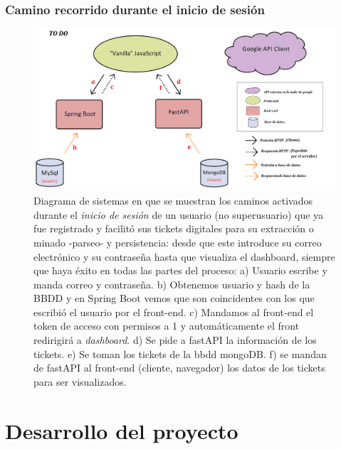 \documentclass[a4paper,12pt]{report}
\begin{document}
				
		\subsection{Camino recorrido durante el inicio de sesión}
		


		\setlength{\belowcaptionskip}{3pt}
		\FloatBarrier
		\begin{figure}[H]
			\centering
			\includegraphics[width=1\textwidth]{img/diagramaSistemesAplicacioMercappCAMIINICISESSIO.png}
			\caption{Diagrama de sistemas en que se muestran los caminos activados durante el \textit{inicio de sesión} de un usuario (no superusuario) que ya fue registrado y facilitó sus tickets digitales para su extracción o minado -parseo- y persistencia: desde que este introduce su correo electrónico y su contraseña hasta que visualiza el dashboard, siempre que haya éxito en todas las partes del proceso: a) Usuario escribe y manda correo y contraseña. b) Obtenemos usuario y hash de la BBDD y en Spring Boot vemos que son coincidentes con los que escribió el usuario por el front-end. c) Mandamos al front-end el token de acceso con permisos a 1 y automáticamente el front redirigirá a \textit{dashboard}. d) Se pide a fastAPI la información de los tickets. e) Se toman los tickets de la bbdd mongoDB. f) se mandan de fastAPI al front-end (cliente, navegador) los datos de los tickets para ser visualizados.}
			\label{fig:diagramaSistemesAplicacioMercappCAMIINICISESSIO} 
		\end{figure}
		\FloatBarrier
		








		
	\pagebreak
	\chapter{Desarrollo del proyecto} %
	
\end{document}
